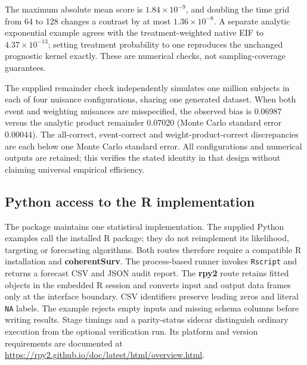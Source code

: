 \documentclass[article,nojss]{jss}
\newcommand{\pkg}[1]{\textbf{#1}}
\newcommand{\proglang}[1]{\textsf{#1}}
\newcommand{\code}[1]{\texttt{#1}}
\begin{document}
The maximum absolute mean score is $1.84\times10^{-9}$, and doubling the time grid from 64 to 128 changes a contrast by at most $1.36\times10^{-8}$. A separate analytic exponential example agrees with the treatment-weighted native EIF to $4.37\times10^{-13}$; setting treatment probability to one reproduces the unchanged prognostic kernel exactly. These are numerical checks, not sampling-coverage guarantees.

The supplied remainder check independently simulates one million subjects in each of four nuisance configurations, sharing one generated dataset. When both event and weighting nuisances are misspecified, the observed bias is 0.06987 versus the analytic product remainder 0.07020 (Monte Carlo standard error 0.00044). The all-correct, event-correct and weight-product-correct discrepancies are each below one Monte Carlo standard error. All configurations and numerical outputs are retained; this verifies the stated identity in that design without claiming universal empirical efficiency.


\subsection{Python access to the R implementation}\label{sec:python}
The package maintains one statistical implementation. The supplied \proglang{Python} examples call the installed \proglang{R} package; they do not reimplement its likelihood, targeting or forecasting algorithms. Both routes therefore require a compatible \proglang{R} installation and \pkg{coherentSurv}. The process-based runner invokes \code{Rscript} and returns a forecast CSV and JSON audit report. The \pkg{rpy2} route retains fitted objects in the embedded \proglang{R} session and converts input and output data frames only at the interface boundary. CSV identifiers preserve leading zeros and literal \code{NA} labels. The example rejects empty inputs and missing schema columns before writing results. Stage timings and a parity-status sidecar distinguish ordinary execution from the optional verification run. Its platform and version requirements are documented at \url{https://rpy2.github.io/doc/latest/html/overview.html}.
\end{document}
